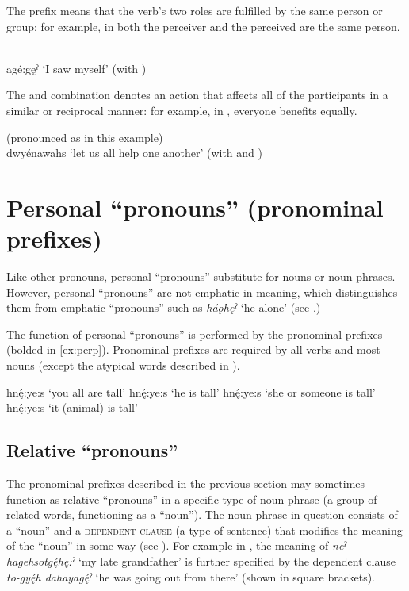 The  {} prefix means that the verb’s two roles are fulfilled by the same person or group: for example, in  both the perceiver and the perceived are the same person.

\ea\label{ex:rflp}  {}\\
agé:gęˀ ‘I saw myself’ (with {})
\z


The  \textsc{\dualic} and  {\reciprocal} combination denotes an action that affects all of the participants in a similar or reciprocal manner: for example, in , everyone benefits equally.

\ea\label{ex:rflp2}  {\reciprocal} (pronounced as  in this example)\\
dwyénawahs ‘let us all help one another’ (with \textsc{\dualic} and {\reciprocal})
\z


\section{Personal “pronouns” (pronominal prefixes)} \label{ch:’Personal pronouns’ (pronominal prefixes)}
Like other pronouns, personal “pronouns” substitute for nouns or noun phrases. However, personal “pronouns” are not emphatic in meaning, which distinguishes them from emphatic “pronouns” such as \textit{háǫhęˀ} ‘he alone’ (see .)

The function of personal “pronouns” is performed by the pronominal prefixes (bolded in \ref{ex:perp}). Pronominal prefixes are required by all verbs and most nouns (except the atypical words described in ).

\ea\label{ex:perp}
\ea {}hnę́:ye:s ‘you all are tall’
\ex {}hnę́:ye:s ‘he is tall’ 
\ex {}hnę́:ye:s ‘she or someone is tall’
\ex {}hnę́:ye:s ‘it (animal) is tall’
\z
\z



\subsection{Relative “pronouns”} \label{ch:’Relative pronouns’}
The pronominal prefixes described in the previous section may sometimes function as relative “pronouns” in a specific type of noun phrase (a group of related words, functioning as a “noun”). The noun phrase in question  consists of a “noun” and a \textsc{dependent clause}  (a type of sentence) that modifies the meaning of the “noun” in some way (see ). For example in , the meaning of \textit{neˀ hagehsotgę́hę:ˀ} ‘my late grandfather’ is further specified by the dependent clause \textit{to-gyę́h dahayagę́ˀ} ‘he was going out from there’ (shown in square brackets). 


